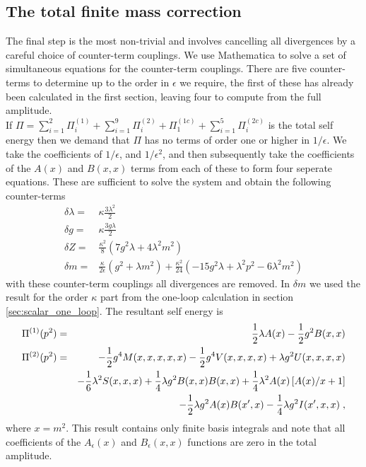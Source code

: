 \documentclass[11pt]{article}
\begin{document}
\subsection{The total finite mass correction}

The final step is the most non-trivial and involves cancelling all divergences by a careful choice of counter-term couplings.  We use Mathematica to solve a set of simultaneous equations for the counter-term couplings.  There are five counter-terms to determine up to the order in $\epsilon$ we require, the first of these has already been calculated in the first section, leaving four to compute from the full amplitude.\\

If $\Pi=\sum_{i=1}^{2} \Pi^{(1)}_i + \sum_{i=1}^{9} \Pi^{(2)}_i + \Pi^{(1c)}_1 + \sum_{i=1}^{5} \Pi^{(2c)}_i$ is the total self energy then we demand that $\Pi$ has no terms of order one or higher in $1/\epsilon$.  We take the coefficients of $1/\epsilon$, and $1/\epsilon^2$, and then subsequently take the coefficients of the $A(x)$ and $B(x,x)$ terms from each of these to form four seperate equations.  These are sufficient to solve the system and obtain the following counter-terms
\begin{align}
\delta \lambda=& \kappa\frac{3\lambda^2}{2}\\
\delta g=& \kappa\frac{3g\lambda}{2}\\
\delta Z=& \frac{\kappa^2}{8}\left(7g^2\lambda+4\lambda^2m^2\right)\\
\delta m=&\frac{\kappa}{2\epsilon} \left(g^2+\lambda m^2\right)+ \frac{\kappa^2}{24}\left(-15g^2\lambda+\lambda^2p^2-6\lambda^2m^2\right)
\end{align}
with these counter-term couplings all divergences are removed.  In $\delta m$ we used the result for the order $\kappa$ part from the one-loop calculation in section \ref{sec:scalar_one_loop}.  The resultant self energy is
\begin{eqnarray}
\Pi^{(1)}(p^2) &=& {1\over2}\lambda A(x) - {1\over2}g^2 B(x,x)\\
\Pi^{(2)}(p^2) &=& -{1\over2}g^4 M(x,x,x,x,x) 
-{1\over2}g^4V(x,x,x,x) +\lambda g^2U(x,x,x,x)
\nonumber\\
&& -{1\over6}\lambda^2 S(x,x,x)
+{1\over4}\lambda g^2 B(x,x)B(x,x)
+{1\over4}\lambda^2 A(x)\left[A(x)/x+1\right]\\
&& - {1\over2}\lambda g^2 A(x)B(x^\prime,x)
- {1\over4}\lambda g^2 I(x^\prime,x,x)\; ,
\nonumber
\end{eqnarray}
where $x=m^2$.  This result contains only finite basis integrals and note that all coefficients of the $A_{\epsilon}(x)$ and $B_{\epsilon}(x,x)$ functions are zero in the total amplitude.
\end{document}
